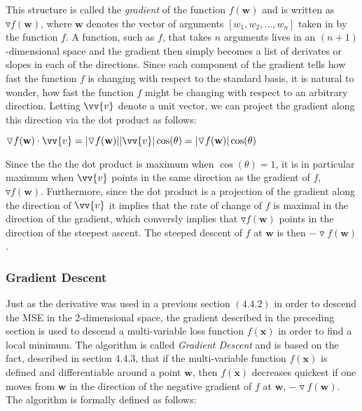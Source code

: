 \documentclass[titlepage]{article}
\begin{document}
\vskip 0.5cm 

\centerline{}

\vskip 0.5cm

\noindent
This structure is called the \emph{gradient} of the function $f(\mathbf{w})$ and is written as $\triangledown f(\mathbf{w})$, where $\mathbf{w}$ denotes the vector of arguments $[w_{1}, w_{2}, ..., w_{n}]$ taken in by the function $f$. A function, such as $f$, that takes $n$ arguments lives in an $(n+1)$-dimensional space and the gradient then simply becomes a list of derivates or slopes in each of the directions. Since each component of the gradient tells how fast the function $f$ is changing with respect to the standard basis, it is natural to wonder, how fast the function $f$ might be changing with respect to an arbitrary direction. Letting $\vv{v}$ denote a unit vector, we can project the gradient along this direction via the dot product as follows:

\vskip 0.5cm

\centerline{$\triangledown f(\mathbf{w}) \cdot \vv{v} = |\triangledown f(\mathbf{w})||\vv{v}|\cos(\theta) = |\triangledown f(\mathbf{w})|\cos(\theta)$}

\vskip 0.5cm

\noindent
Since the the the dot product is maximum when $\cos(\theta) = 1$, it is in particular maximum when $\vv{v}$ points in the same direction as the gradient of $f$, $\triangledown f(\mathbf{w})$. Furthermore, since the dot product is a projection of the gradient along the direction of $\vv{v}$ it implies that the rate of change of $f$ is maximal in the direction of the gradient, which conversly implies that $\triangledown f(\mathbf{w})$ points in the direction of the steepest ascent. The steeped descent of $f$ at $\mathbf{w}$ is then $-\triangledown f(\mathbf{w})$.

\newpage

\subsubsection{Gradient Descent}

\vskip 0.2cm

\noindent
Just as the derivative was used in a previous section $(4.4.2)$ in order to descend the MSE in the 2-dimensional space, the gradient described in the preceding section is used to descend a multi-variable loss function $f(\mathbf{x})$ in order to find a local minimum. The algorithm is called \emph{Gradient Descent} \cite{skansi} and is based on the fact, described in section 4.4.3, that if the multi-variable function $f(\mathbf{x})$ is defined and differentiable around a point $\mathbf{w}$, then $f(\mathbf{x})$ decreases quickest if one moves from $\mathbf{w}$ in the direction of the negative gradient of $f$ at $\mathbf{w}$, $-\triangledown f(\mathbf{w})$. The algorithm is formally defined as follows:
\end{document}
